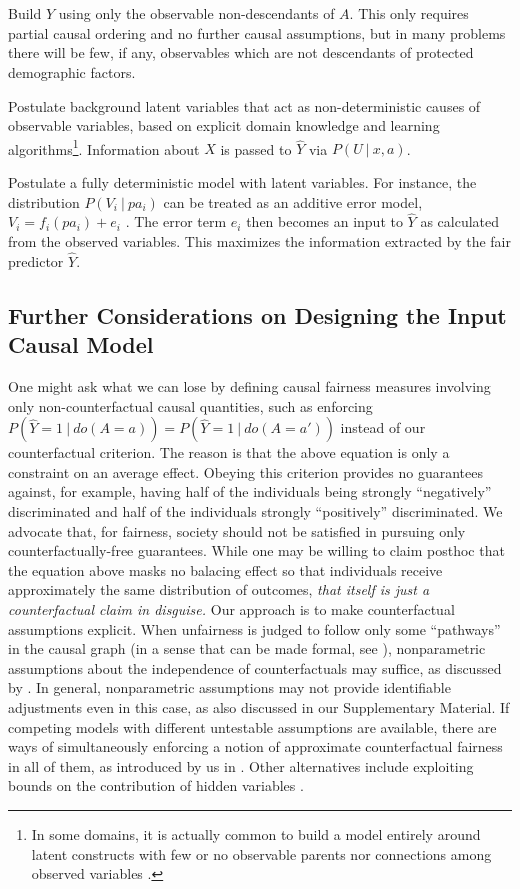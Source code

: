   Build $\hat Y$ using only the observable
non-descendants of $A$.  This only requires partial causal ordering
and no further causal assumptions, but in many problems there will be
few, if any, observables which are not descendants of protected
demographic factors.
  
 Postulate background latent variables that
act as non-deterministic causes of observable variables, based on
explicit domain knowledge and learning algorithms\footnote{In some
  domains, it is actually common to build a model entirely around
  latent constructs with few or no observable parents nor connections
  among observed variables \citep{bol:89}.}. Information about $X$ is
passed to $\hat Y$ via $P(U\ |\ x, a)$.

 Postulate a fully deterministic model with
latent variables. For instance, the distribution $P(V_i\ |\ pa_i)$
can be treated as an additive error model, $V_i
\!=\! f_i(pa_i) \!+\! e_i$ \citep{peters:14}. The
error term $e_i$ then becomes an input to $\hat Y$ as calculated from
the observed variables. This maximizes the information extracted by
the fair predictor $\hat Y$.

\subsection{Further Considerations on Designing the Input Causal Model}
\label{sec:pragmatic}

One might ask what we can lose by defining causal fairness measures involving
only non-counterfactual causal quantities, such as enforcing $P(\hat Y =
1\ |\ do(A = a)) = P(\hat Y = 1\ |\ do(A = a'))$ instead of our
counterfactual criterion. The reason is that the above equation is
only a constraint on an average effect. Obeying this criterion
provides no guarantees against, for example, having half of the
individuals being strongly ``negatively'' discriminated and half of
the individuals strongly ``positively'' discriminated.  We advocate
that, for fairness, society should not be satisfied in pursuing only
counterfactually-free guarantees. While one may be willing to claim
posthoc that the equation above masks no balacing effect so that
individuals receive approximately the same distribution of outcomes,
{\it that itself is just a counterfactual claim in disguise.} Our
approach is to make counterfactual assumptions explicit. When
unfairness is judged to follow only some ``pathways'' in the causal
graph (in a sense that can be made formal, see
\cite{kilbertus:17,nabi:17}), nonparametric assumptions about the
independence of counterfactuals may suffice, as discussed by
\cite{nabi:17}. In general, nonparametric assumptions may not provide
identifiable adjustments even in this case, as also discussed in our
Supplementary Material.  If competing models with different untestable
assumptions are available, there are ways of simultaneously enforcing a notion of
approximate counterfactual fairness in all of them, as introduced by
us in \cite{russell:17}. Other alternatives include exploiting
bounds on the contribution of hidden variables \cite{pearl:16,silva:16}.

